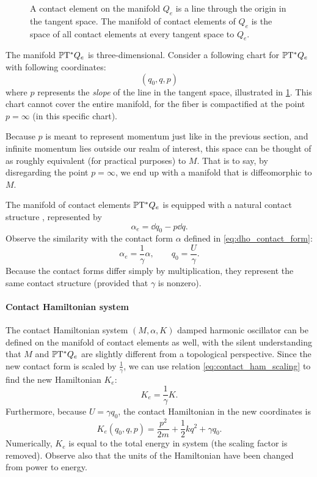 \begin{figure}
    \centering
    
    \caption{A contact element on the manifold $Q_e$ is a line through the origin in the tangent space. The manifold of contact elements of $Q_e$ is the space of all contact elements at every tangent space to $Q_e$.}
    \label{fig:manifold_contact_elements}
\end{figure}

The manifold $\mathbb{P}\mathrm{T}^* Q_e$ is three-dimensional. Consider a following chart for $\mathbb{P}\mathrm{T}^* Q_e$ with following coordinates:
$$ (q_0, q, p)$$
where $p$ represents the \emph{slope} of the line in the tangent space, illustrated in \cref{fig:manifold_contact_elements}. This chart cannot cover the entire manifold, for the fiber is compactified at the point $p = \infty$ (in this specific chart). 

Because $p$ is meant to represent momentum just like in the previous section, and infinite momentum lies outside our realm of interest, this space can be thought of as roughly equivalent (for practical purposes) to $M$. That is to say, by disregarding the point $p = \infty$, we end up with a manifold that is diffeomorphic to $M$.

The manifold of contact elements $\mathbb{P}\mathrm{T}^* Q_e$ is equipped with a natural contact structure \cite{Arnold1989}, represented by
\begin{equation}
    \alpha_e = \dd{q}_0 - p\dd{q}.
\end{equation}
Observe the similarity with the contact form $\alpha$ defined in \cref{eq:dho_contact_form}: 
$$
    \alpha_e = \frac{1}{\gamma}\alpha, \qquad q_0 = \frac{U}{\gamma}. 
$$
Because the contact forms differ simply by multiplication, they represent the same contact structure (provided that $\gamma$ is nonzero).

\paragraph{Contact Hamiltonian system} The contact Hamiltonian system $(M, \alpha, K)$ damped harmonic oscillator can be defined on the manifold of contact elements as well, with the silent understanding that $M$ and $\mathbb{P}\mathrm{T}^* Q_e$ are slightly different from a topological perspective. Since the new contact form is scaled by $\tfrac{1}{\gamma}$, we can use relation \cref{eq:contact_ham_scaling} to find the new Hamiltonian $K_e$:
$$ K_e = \frac{1}{\gamma} K. $$
Furthermore, because $U = \gamma q_0$, the contact Hamiltonian in the new coordinates is
\begin{equation}
    K_e(q_0, q, p) = \frac{p^2}{2m} + \frac{1}{2}kq^2 + \gamma q_0.
    \label{eq:dho_contact_hamiltonian_e}
\end{equation}
Numerically, $K_e$ is equal to the total energy in system (the scaling factor is removed). Observe also that the units of the Hamiltonian have been changed from power to energy.

